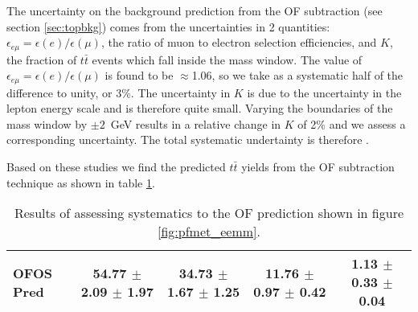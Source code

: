 The uncertainty on the background prediction from the OF subtraction (see section \ref{sec:topbkg}) 
comes from the uncertainties in 2
quantities: $\epsilon_{e\mu} = \epsilon(e)/\epsilon(\mu)$, the ratio of muon to electron selection 
efficiencies,
and $K$, the fraction of $t\bar{t}$ events which fall inside the \Z mass window.
The value of $\epsilon_{e\mu} = \epsilon(e)/\epsilon(\mu)$ is found to be 
$\approx$1.06, so we take as a 
systematic half of the difference to unity, or 3\%.
%
%
%
The uncertainty in $K$ is due to the uncertainty in the lepton energy scale and is therefore quite small.
Varying the boundaries of the \Z mass window by $\pm2$~GeV results in a relative change in $K$ of 2\% 
and we assess a corresponding uncertainty. 
The total systematic undertainty is therefore \ofsystpercentage.

Based on these studies we find the predicted $t\bar{t}$ yields from the OF subtraction technique as shown in table \ref{tab:ofsystres}.


\begin{table}[hbt]
  \begin{center}
	\caption{
	  \label{tab:ofsystres} 
	  Results of assessing \ofsystpercentage systematics to the OF prediction shown in figure \ref{fig:pfmet_eemm}.
	}
	\begin{tabular}{lcccc}
	  \hline
	  \resulttitle
\hline
OFOS Pred &  54.77 $\pm$ 2.09 $\pm$ 1.97  &    34.73 $\pm$ 1.67 $\pm$ 1.25  &    11.76 $\pm$ 0.97 $\pm$ 0.42  &     1.13 $\pm$ 0.33 $\pm$ 0.04 \\

\hline
	\end{tabular}
  \end{center}
\end{table}

